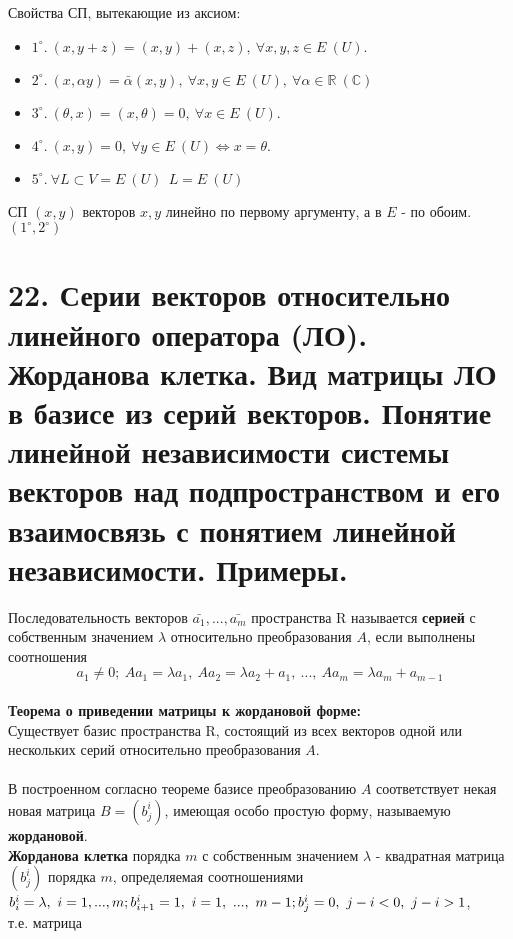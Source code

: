 \documentclass[14pt]{extarticle}
\begin{document}
Свойства СП, вытекающие из аксиом: 
\begin{itemize}
  \item $1^\circ.\ (x, y+z) = (x,y) + (x, z), \ \forall x, y, z \in E \ (U).$ 
  \item $2^\circ.\ (x, \alpha y) = \bar \alpha(x,y), 
  \ \forall x, y \in E \ (U), \ \forall \alpha \in \mathbb{R} \ (\mathbb{C})$ 
  \item $3^\circ.\ (\theta, x) = (x,\theta) = 0, \ \forall x \in E \ (U).$ 
  \item $4^\circ.\ (x,y) = 0, \ \forall y \in E \ (U) \Leftrightarrow x = \theta.$ 
  \item $5^\circ.\ \forall L \subset V = E\ (U) \ \ L = E\ (U)$
\end{itemize}
СП $(x,y)$ векторов $x,y$ линейно по первому аргументу, а в $E$ - по обоим.
$(1^\circ, 2^\circ)$


\section{22. 
    Серии векторов относительно линейного оператора (ЛО). Жорданова клетка. 
    Вид матрицы ЛО в базисе из серий векторов. Понятие линейной независимости 
    системы векторов над подпространством и его взаимосвязь 
    с понятием линейной независимости. Примеры.
}

Последовательность векторов $\bar{a_1}, ..., \bar{a_m}$
пространства R называется \textbf{серией} с собственным значением 
$\lambda$ относительно преобразования $A$, если выполнены соотношения
$$ a_1 \neq 0; \ Aa_1 = \lambda a_1, \ Aa_2 = \lambda a_2 + a_1, \ ..., \
Aa_m = \lambda a_m + a_{m-1} $$
\\
\textbf{Теорема о приведении матрицы к жордановой форме:} \\
Существует базис пространства R, состоящий из всех векторов одной или 
нескольких серий относительно преобразования $A$. 
\\\\
В построенном согласно теореме базисе преобразованию $A$ соответствует 
некая новая матрица $B = (b^i_j)$, имеющая особо простую форму, 
называемую \textbf{жордановой}. \\
\textbf{Жорданова клетка} порядка $m$ с собственным значением $\lambda$ -
квадратная матрица $(b^i_j)$ порядка $m$, определяемая соотношениями \\
$ b^i_i = \lambda, \ i = 1, ... , m; \\ b^i_{i+1} = 1, \ i = 1, \ ... , \
m - 1; \\ b^i_j = 0, \ j - i < 0, \ j - i > 1 $, \\ т.е. матрица 
\end{document}
